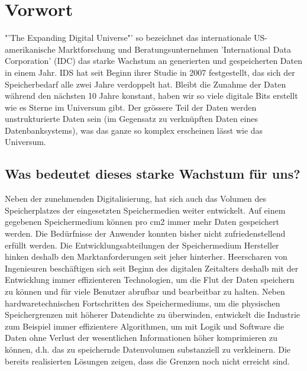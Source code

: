 
\cleardoublepage
\chapter{Vorwort}
"'The Expanding Digital Universe"' so bezeichnet das internationale US-amerikanische Marktforschung und Beratungsunternehmen 'International Data Corporation' (IDC) das starke Wachstum an generierten und gespeicherten Daten in einem Jahr. IDS hat seit Beginn ihrer Studie in 2007 festgestellt, das sich der Speicherbedarf alle zwei Jahre verdoppelt hat. Bleibt die Zunahme der Daten während den nächsten 10 Jahre konstant, haben wir so viele digitale Bits erstellt wie es Sterne im Universum gibt. Der grössere Teil der Daten werden unstrukturierte Daten sein (im Gegensatz zu verknüpften Daten eines Datenbanksystems), was das ganze so komplex erscheinen lässt wie das Universum. \cite{Gantz2011}

\section{Was bedeutet dieses starke Wachstum für uns?}
Neben der zunehmenden Digitalisierung, hat sich auch das Volumen des Speicherplatzes der eingesetzten Speichermedien weiter entwickelt. Auf einem gegebenen Speichermedium können pro cm2 immer mehr Daten gespeichert werden. Die Bedürfnisse der Anwender konnten bisher nicht zufriedenstellend erfüllt werden. Die Entwicklungsabteilungen der Speichermedium Hersteller hinken deshalb den Marktanforderungen seit jeher hinterher. Heerscharen von Ingenieuren beschäftigen sich seit Beginn des digitalen Zeitalters deshalb mit der Entwicklung immer effizienteren Technologien, um die Flut der Daten speichern zu können und für viele Benutzer abrufbar und bearbeitbar zu halten. Neben hardwaretechnischen Fortschritten des Speichermediums, um die physischen Speichergrenzen mit höherer Datendichte zu überwinden, entwickelt die Industrie zum Beispiel immer effizientere Algorithmen, um mit Logik und Software die Daten ohne Verlust der wesentlichen Informationen höher komprimieren zu können, d.h. das zu speichernde Datenvolumen substanziell zu verkleinern. Die bereits realisierten Lösungen zeigen, dass die Grenzen noch nicht erreicht sind.

